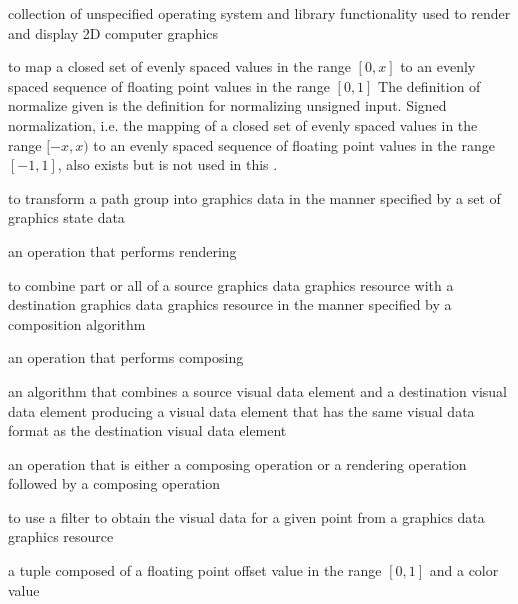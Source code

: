 collection of unspecified operating system and library functionality used to render and display 2D computer graphics

to map a closed set of evenly spaced values in the range $[0, x]$ to an evenly spaced sequence of floating point values in the range $[0, 1]$
\enternote
The definition of normalize given is the definition for normalizing unsigned input. Signed normalization, i.e. the mapping of a closed set of evenly spaced values in the range $[-x, x)$ to an evenly spaced sequence of floating point values in the range $[-1, 1]$, also exists but is not used in this \documenttypename{}.
\exitnote

to transform a path group into graphics data in the manner specified by a set of graphics state data

an operation that performs rendering

to combine part or all of a source graphics data graphics resource with a destination graphics data graphics resource in the manner specified by a composition algorithm

an operation that performs composing

an algorithm that combines a source visual data element and a destination visual data element producing a visual data element that has the same visual data format as the destination visual data element

an operation that is either a composing operation or a rendering operation followed by a composing operation

to use a filter to obtain the visual data for a given point from a graphics data graphics resource

a tuple composed of a floating point offset value in the range $[0, 1]$ and a color value



%
%

